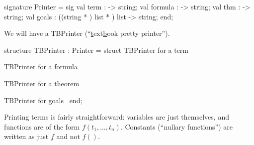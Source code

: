 \nwenddocs{}\endmoddef\nwstartdeflinemarkup\nwenddeflinemarkup
signature Printer = sig
  val term :  -> string;
  val formula :  -> string;
  val thm :  -> string;
  val goals : ((string * ) list * ) list -> string;
end;
\nwendcode{}\nwdocspar

\begin{node}
We will have a {\Tt{}TBPrinter\nwendquote} (``\underline{t}ext\underline{b}ook
pretty printer'').
\end{node}

\nwenddocs{}\endmoddef\nwstartdeflinemarkup\nwenddeflinemarkup
structure TBPrinter : Printer = struct
\LA{}TBPrinter for a term~{\nwtagstyle{}}\RA{}

\LA{}TBPrinter for a formula~{\nwtagstyle{}}\RA{}

\LA{}TBPrinter for a theorem~{\nwtagstyle{}}\RA{}

\LA{}TBPrinter for goals~{\nwtagstyle{}}\RA{}
end;
\nwendcode{}\nwdocspar

\begin{node}
Printing terms is fairly straightforward: variables are just
themselves, and functions are of the form $f(t_{1},\dots,t_{n})$.
Constants (``nullary functions'') are written as just $f$ and not $f()$.
\end{node}

